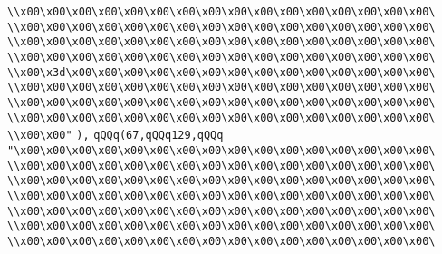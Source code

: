 \verb|\\x00\x00\x00\x00\x00\x00\x00\x00\x00\x00\x00\x00\x00\x00\x00\x00\|\newline
\verb|\\x00\x00\x00\x00\x00\x00\x00\x00\x00\x00\x00\x00\x00\x00\x00\x00\|\newline
\verb|\\x00\x00\x00\x00\x00\x00\x00\x00\x00\x00\x00\x00\x00\x00\x00\x00\|\newline
\verb|\\x00\x00\x00\x00\x00\x00\x00\x00\x00\x00\x00\x00\x00\x00\x00\x00\|\newline
\verb|\\x00\x3d\x00\x00\x00\x00\x00\x00\x00\x00\x00\x00\x00\x00\x00\x00\|\newline
\verb|\\x00\x00\x00\x00\x00\x00\x00\x00\x00\x00\x00\x00\x00\x00\x00\x00\|\newline
\verb|\\x00\x00\x00\x00\x00\x00\x00\x00\x00\x00\x00\x00\x00\x00\x00\x00\|\newline
\verb|\\x00\x00\x00\x00\x00\x00\x00\x00\x00\x00\x00\x00\x00\x00\x00\x00\|\newline
\verb|\\x00\x00"|\newline
\verb|),|\newline
\verb|qQQq(67,qQQq129,qQQq|\newline
\verb|"\x00\x00\x00\x00\x00\x00\x00\x00\x00\x00\x00\x00\x00\x00\x00\x00\|\newline
\verb|\\x00\x00\x00\x00\x00\x00\x00\x00\x00\x00\x00\x00\x00\x00\x00\x00\|\newline
\verb|\\x00\x00\x00\x00\x00\x00\x00\x00\x00\x00\x00\x00\x00\x00\x00\x00\|\newline
\verb|\\x00\x00\x00\x00\x00\x00\x00\x00\x00\x00\x00\x00\x00\x00\x00\x00\|\newline
\verb|\\x00\x00\x00\x00\x00\x00\x00\x00\x00\x00\x00\x00\x00\x00\x00\x00\|\newline
\verb|\\x00\x00\x00\x00\x00\x00\x00\x00\x00\x00\x00\x00\x00\x00\x00\x00\|\newline
\verb|\\x00\x00\x00\x00\x00\x00\x00\x00\x00\x00\x00\x00\x00\x00\x00\x00\|\newline
